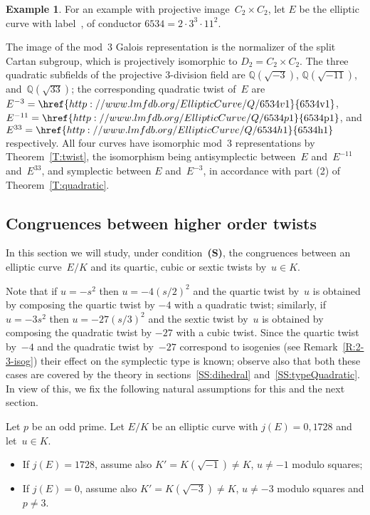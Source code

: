 \documentclass[12pt, reqno]{amsart}
\newcommand{\lmfdbec}[3]{\href{http://www.lmfdb.org/EllipticCurve/Q/#1#2#3}{{\text{\rm#1#2#3}}}}
\newcommand{\Q}{\mathbb{Q}}
\numberwithin{equation}{section}
\theoremstyle{definition}
\newtheorem{example}[theorem]{Example}
\theoremstyle{remark}
\begin{document}
\begin{example} \label{Ex:3twists}
  For an example with projective image~$C_2\times C_2$, let $E$ be the
  elliptic curve with label~\lmfdbec{6534}{a}{1}, of conductor
  $6534=2\cdot3^3\cdot11^2$.  

  The image of the mod~$3$ Galois representation is the normalizer of
  the split Cartan subgroup, which
  is projectively isomorphic to $D_2 = C_2\times C_2$.  The three quadratic
  subfields of the projective $3$-division field are $\Q(\sqrt{-3})$,
  $\Q(\sqrt{-11})$, and~$\Q(\sqrt{33})$; the corresponding quadratic
  twist of~$E$ are $E^{-3}=\lmfdbec{6534}{v}{1}$,
  $E^{-11}=\lmfdbec{6534}{p}{1}$, and $E^{33}=\lmfdbec{6534}{h}{1}$
  respectively.  All four curves have isomorphic mod~$3$
  representations by Theorem~\ref{T:twist}, the isomorphism being antisymplectic between~$E$
  and~$E^{-11}$ and~$E^{33}$, and symplectic between $E$ and~$E^{-3}$,
  in accordance with part (2) of
  Theorem~\ref{T:quadratic}.
\end{example}


\subsection{Congruences between higher order twists} \label{SS:higherCong}
In this section we will study, under condition~{\bf (S)}, the congruences between an elliptic curve~$E/K$ and its quartic, cubic or sextic twists by~$u \in K$.

Note that if $u = -s^2$ then $u = -4(s/2)^2$ and the quartic twist
by~$u$ is obtained by composing the quartic twist by $-4$ with a
quadratic twist; similarly, if $u = -3s^2$ then $u = -27(s/3)^2$ and
the sextic twist by~$u$ is obtained by composing the quadratic twist
by $-27$ with a cubic twist. Since the quartic twist by~$-4$ and the
quadratic twist by~$-27$ correspond to isogenies (see
Remark~\ref{R:2-3-isog}) their effect on the symplectic type is
known; observe also that both these cases are covered by the theory in
sections~\ref{SS:dihedral} and~\ref{SS:typeQuadratic}.  In view of
this, we fix the following natural assumptions for this and the next
section.

Let $p$ be an odd prime. 
Let $E/K$ be an elliptic curve 
with $j(E) = 0, 1728$ and let~$u \in K$.
\begin{itemize}
 \item If $j(E) = 1728$, assume also $K'=K(\sqrt{-1}) \neq K$, 
 $u \neq -1$ modulo squares;
 \item If $j(E) = 0$, assume also $K'=K(\sqrt{-3}) \neq K$, 
 $u \neq -3$ modulo squares and
$p\not=3$. 
\end{itemize}
\end{document}
